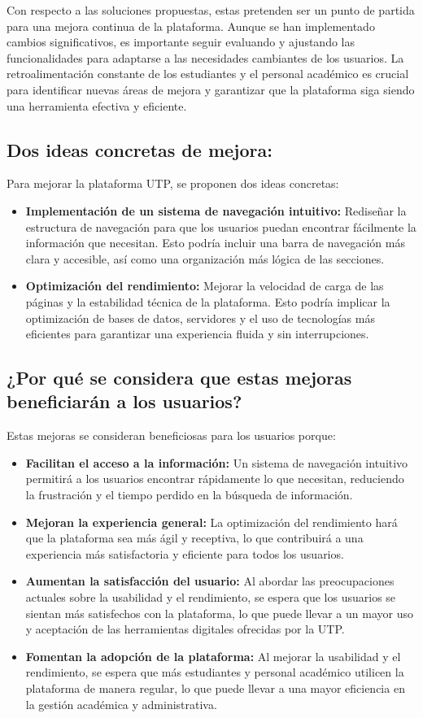 \documentclass{article}
\begin{document}
Con respecto a las soluciones propuestas, estas pretenden ser un punto de partida para una mejora continua de la plataforma. Aunque se han implementado cambios significativos, es importante seguir evaluando y ajustando las funcionalidades para adaptarse a las necesidades cambiantes de los usuarios. La retroalimentación constante de los estudiantes y el personal académico es crucial para identificar nuevas áreas de mejora y garantizar que la plataforma siga siendo una herramienta efectiva y eficiente.

\subsection*{Dos ideas concretas de mejora:}

Para mejorar la plataforma UTP, se proponen dos ideas concretas:
\begin{itemize}
  \item \textbf{Implementación de un sistema de navegación intuitivo:} Rediseñar la estructura de navegación para que los usuarios puedan encontrar fácilmente la información que necesitan. Esto podría incluir una barra de navegación más clara y accesible, así como una organización más lógica de las secciones.
  \item \textbf{Optimización del rendimiento:} Mejorar la velocidad de carga de las páginas y la estabilidad técnica de la plataforma. Esto podría implicar la optimización de bases de datos, servidores y el uso de tecnologías más eficientes para garantizar una experiencia fluida y sin interrupciones.
\end{itemize}

\subsection*{¿Por qué se considera que estas mejoras beneficiarán a los usuarios?}
Estas mejoras se consideran beneficiosas para los usuarios porque:
\begin{itemize}
  \item \textbf{Facilitan el acceso a la información:} Un sistema de navegación intuitivo permitirá a los usuarios encontrar rápidamente lo que necesitan, reduciendo la frustración y el tiempo perdido en la búsqueda de información.
  \item \textbf{Mejoran la experiencia general:} La optimización del rendimiento hará que la plataforma sea más ágil y receptiva, lo que contribuirá a una experiencia más satisfactoria y eficiente para todos los usuarios.
  \item \textbf{Aumentan la satisfacción del usuario:} Al abordar las preocupaciones actuales sobre la usabilidad y el rendimiento, se espera que los usuarios se sientan más satisfechos con la plataforma, lo que puede llevar a un mayor uso y aceptación de las herramientas digitales ofrecidas por la UTP.
  \item \textbf{Fomentan la adopción de la plataforma:} Al mejorar la usabilidad y el rendimiento, se espera que más estudiantes y personal académico utilicen la plataforma de manera regular, lo que puede llevar a una mayor eficiencia en la gestión académica y administrativa.
\end{itemize}
\end{document}
